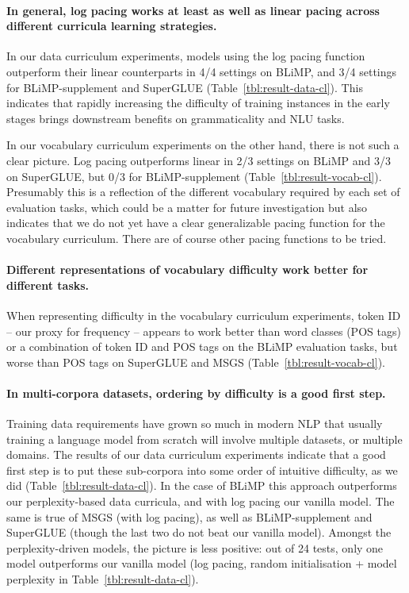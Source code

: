 \paragraph{In general, log pacing works at least as well as linear pacing across different curricula learning strategies.}
In our data curriculum experiments, models using the log pacing function outperform their linear counterparts in 4/4 settings on BLiMP, and 3/4 settings for BLiMP-supplement and SuperGLUE (Table~\ref{tbl:result-data-cl}). This indicates that rapidly increasing the difficulty of training instances in the early stages brings downstream benefits on grammaticality and NLU tasks.

In our vocabulary curriculum experiments on the other hand, there is not such a clear picture. Log pacing outperforms linear in 2/3 settings on BLiMP and 3/3 on SuperGLUE, but 0/3 for BLiMP-supplement (Table~\ref{tbl:result-vocab-cl}).
Presumably this is a reflection of the different vocabulary required by each set of evaluation tasks, which could be a matter for future investigation but also indicates that we do not yet have a clear generalizable pacing function for the vocabulary curriculum. There are of course other pacing functions to be tried.

\paragraph{Different representations of vocabulary difficulty work better for different tasks.}
When representing difficulty in the vocabulary curriculum experiments, token ID -- our proxy for frequency -- appears to work better than word classes (POS tags) or a combination of token ID and POS tags on the BLiMP evaluation tasks, but worse than POS tags on SuperGLUE and MSGS (Table~\ref{tbl:result-vocab-cl}).


\paragraph{In multi-corpora datasets, ordering by difficulty is a good first step.}
Training data requirements have grown so much in modern NLP that usually training a language model from scratch will involve multiple datasets, or multiple domains. The results of our data curriculum experiments indicate that a good first step is to put these sub-corpora into some order of intuitive difficulty, as we did (Table~\ref{tbl:result-data-cl}). In the case of BLiMP this approach outperforms our perplexity-based data curricula, and with log pacing our vanilla model. The same is true of MSGS  (with log pacing), as well as BLiMP-supplement and SuperGLUE (though the last two do not beat our vanilla model). 
Amongst the perplexity-driven models, the picture is less positive: out of 24 tests, only one model outperforms our vanilla model (log pacing, random initialisation + model perplexity in Table~\ref{tbl:result-data-cl}).

